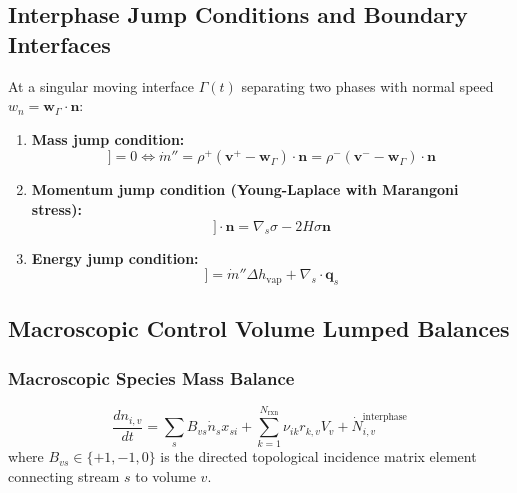 \documentclass[11pt,a4paper]{article}
\begin{document}
\subsection{Interphase Jump Conditions and Boundary Interfaces}

At a singular moving interface $\Gamma(t)$ separating two phases with normal speed $w_n = \mathbf{w}_{\Gamma} \cdot \mathbf{n}$:
\begin{enumerate}[leftmargin=*]
    \item \textbf{Mass jump condition:}
    \begin{equation}
    [\![\rho (\mathbf{v} - \mathbf{w}_\Gamma) \cdot \mathbf{n}]\!] = 0 \iff \dot{m}'' = \rho^+ (\mathbf{v}^+ - \mathbf{w}_\Gamma) \cdot \mathbf{n} = \rho^- (\mathbf{v}^- - \mathbf{w}_\Gamma) \cdot \mathbf{n}
    \end{equation}
    \item \textbf{Momentum jump condition (Young-Laplace with Marangoni stress):}
    \begin{equation}
    [\![\rho \mathbf{v} \otimes (\mathbf{v} - \mathbf{w}_\Gamma) - \boldsymbol{\sigma}]\!] \cdot \mathbf{n} = \nabla_s \sigma - 2 H \sigma \mathbf{n}
    \end{equation}
    \item \textbf{Energy jump condition:}
    \begin{equation}
    [\![\rho e_t (\mathbf{v} - \mathbf{w}_\Gamma) \cdot \mathbf{n} + \mathbf{q} \cdot \mathbf{n} - (\boldsymbol{\sigma} \cdot \mathbf{v}) \cdot \mathbf{n}]\!] = \dot{m}'' \Delta h_{\text{vap}} + \nabla_s \cdot \mathbf{q}_s
    \end{equation}
\end{enumerate}

\subsection{Macroscopic Control Volume Lumped Balances}

\subsubsection{Macroscopic Species Mass Balance}
\begin{equation}
\frac{dn_{i, v}}{dt} = \sum_{s} B_{vs} \dot{n}_s x_{si} + \sum_{k=1}^{N_{\text{rxn}}} \nu_{ik} r_{k, v} V_v + \dot{N}_{i, v}^{\text{interphase}}
\end{equation}
where $B_{vs} \in \{+1, -1, 0\}$ is the directed topological incidence matrix element connecting stream $s$ to volume $v$.
\end{document}
